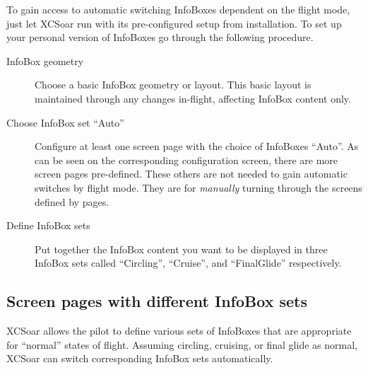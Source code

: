 To gain access to automatic switching InfoBoxes dependent on the flight mode, 
just let XCSoar run with its pre-configured setup from installation. To set up 
your personal version of InfoBoxes go through the following procedure.
\begin{description}
\item[InfoBox geometry] Choose a basic InfoBox geometry or layout.  This basic
layout is maintained through any changes in-flight, affecting InfoBox content 
only.
\item[Choose InfoBox set ``Auto''] Configure at least one screen page with the
choice of InfoBoxes ``Auto''. As can be seen on the corresponding configuration
screen, there are more screen pages pre-defined.   These 
others are not needed to gain automatic switches by flight mode. They are for \emph{manually} turning through the screens defined by pages. 
\item[Define InfoBox sets] Put together the InfoBox content you want to be
displayed in three InfoBox sets called ``Circling'', ``Cruise'', and ``FinalGlide''
respectively.
\end{description}  


\subsection*{Screen pages with different InfoBox sets}\label{sec:screenpages}

XCSoar allows the pilot to define various sets of InfoBoxes that are 
appropriate for ``normal'' states of flight.  Assuming circling,
cruising, or final glide as normal, XCSoar can switch corresponding InfoBox
sets automatically.

